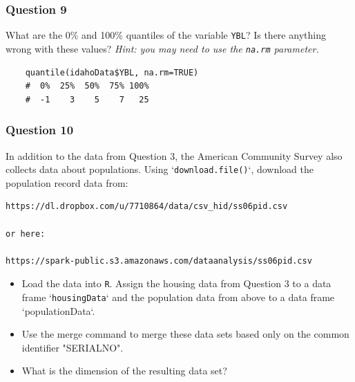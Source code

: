 \documentclass{beamer}
\begin{document}
\begin{frame}[fragile]
\frametitle{Question 9}

What are the 0\% and 100\% quantiles of the variable \texttt{YBL}? Is there anything wrong with these values?
\textit{ Hint: you may need to use the \texttt{na.rm} parameter.}

\begin{framed} 
	\begin{verbatim}
	quantile(idahoData$YBL, na.rm=TRUE)
	#  0%  25%  50%  75% 100% 
	#  -1    3    5    7   25 
	\end{verbatim}
\end{framed} 

\end{frame}
\begin{frame}[fragile]	
\frametitle{Question 10}

In addition to the data from Question 3, the American Community Survey also collects data about populations. 
Using `\texttt{download.file()}`, download the population record data from: 

\begin{verbatim}
https://dl.dropbox.com/u/7710864/data/csv_hid/ss06pid.csv 

or here:

https://spark-public.s3.amazonaws.com/dataanalysis/ss06pid.csv
\end{verbatim}

\end{frame}
\begin{frame}[fragile]
	
\begin{itemize}
	\item Load the data into \texttt{R}. Assign the housing data from Question 3 to a data frame `\texttt{housingData}` and the population data from above to a data frame `populationData`.
	
	\item Use the merge command to merge these data sets based only on the common identifier "SERIALNO". 
	
	\item What is the dimension of the resulting data set? 
\end{itemize}

\end{frame}
\end{document}
